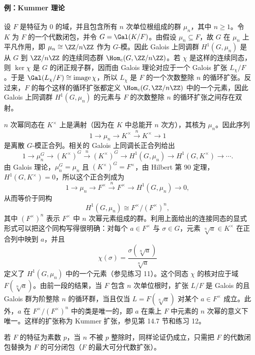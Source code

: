 \paragraph{例：Kummer 理论}
设 $F$ 是特征为 $0$ 的域，并且包含所有 $n$ 次单位根组成的群 $\mu_n$，其中 $n\geq1$。令 $K$ 为 $F$ 的一个代数闭包，并令 $G=\Gal(K/F)$。由假设 $\mu_n\subseteq F$，故 $G$ 在 $\mu_n$ 上平凡作用，即 $\mu_n\cong\ZZ/n\ZZ$ 作为 $G$-模。因此 Galois 上同调群 $H^1(G,\mu_n)$ 是从 $G$ 到 $\ZZ/n\ZZ$ 的连续同态群 $\Hom_c(G,\ZZ/n\ZZ)$。若 $\chi$ 是这样的连续同态，则 $\ker\chi$ 是 $G$ 的闭正规子群，因而由 Galois 理论对应于一个 Galois 扩张 $L_\chi/F$。于是 $\Gal(L_\chi/F)\cong\operatorname{image}\chi$，所以 $L_\chi$ 是 $F$ 的一个次数整除 $n$ 的循环扩张。反过来，$F$ 的每个这样的循环扩张都定义 $\Hom_c(G,\ZZ/n\ZZ)$ 中的一个元素，因此 Galois 上同调群 $H^1(G,\mu_n)$ 的元素与 $F$ 的次数整除 $n$ 的循环扩张之间存在双射。

$n$ 次幂同态在 $K^\times$ 上是满射（因为在 $K$ 中总能开 $n$ 次方），其核为 $\mu_n$。因此序列
\[
  1\to\mu_n\to K^\times\xrightarrow{n}K^\times\to1
\]
是离散 $G$-模正合列。相关的 Galois 上同调长正合列给出
\[
  1\to\mu_n^G\to(K^\times)^G\xrightarrow{n}(K^\times)^G\to H^1(G,\mu_n)\to H^1(G,K^\times)\to\cdots .
\]
由 Galois 理论，$\mu_n^G=\mu_n$ 且 $(K^\times)^G=F^\times$，由 Hilbert 第 90 定理，$H^1(G,K^\times)=0$，所以这个正合列成为
\[
  1\to\mu_n\to F^\times\xrightarrow{n}F^\times\to H^1(G,\mu_n)\to0,
\]
从而等价于同构
\[
  H^1(G,\mu_n)\cong F^\times/(F^\times)^n,
\]
其中 $(F^\times)^n$ 表示 $F^\times$ 中 $n$ 次幂元素组成的群。利用上面给出的连接同态的显式形式可以把这个同构写得很明确：对每个 $a\in F^\times$ 与 $\sigma\in G$，元素 $\sqrt[n]{a}\in K^\times$ 在正合列中映到 $a$，并且
\[
  \chi(\sigma)=\frac{\sigma(\sqrt[n]{a})}{\sqrt[n]{a}}
\]
定义了 $H^1(G,\mu_n)$ 中的一个元素（参见练习 11）。这个同态 $\chi$ 的核对应于域 $F(\sqrt[n]{a})$。由前一段的结果，当 $F$ 包含 $n$ 次单位根时，扩张 $L/F$ 是 Galois 的且 Galois 群为阶整除 $n$ 的循环群，当且仅当 $L=F(\sqrt[n]{a})$ 对某个 $a\in F^\times$ 成立。此外，$a$ 在 $F^\times/(F^\times)^n$ 中的类是唯一的，即 $a$ 在乘上 $F$ 中元素的 $n$ 次幂的意义下唯一。这样的扩张称为 Kummer 扩张，参见第 14.7 节和练习 12。

若 $F$ 的特征为素数 $p$，当 $n$ 不被 $p$ 整除时，同样论证仍成立，只需把 $F$ 的代数闭包替换为 $F$ 的可分闭包（$F$ 的最大可分代数扩张）。

